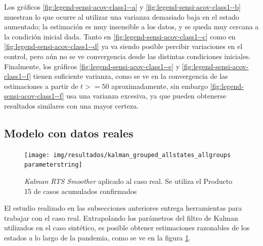 Los gráficos  \ref{fig:legend-sensi-acov-class1--a} y \ref{fig:legend-sensi-acov-class1--b}  muestran lo que ocurre al utilizar una varianza demasiado baja en el estado aumentado; la estimación es muy insensible a los datos, y se queda muy cercana a la condición inicial dada. Tanto en \ref{fig:legend-sensi-acov-class1--c} como en \ref{fig:legend-sensi-acov-class1--d} ya va siendo posible percibir variaciones en el control, pero aún no se ve convergencia desde las distintas condiciones iniciales. Finalmente, los gráficos  \ref{fig:legend-sensi-acov-class1--e} y \ref{fig:legend-sensi-acov-class1--f} tienen suficiente varianza, como se ve en la convergencia de las estimaciones a partir de \(t >=50\) aproximadamente, sin embargo \ref{fig:legend-sensi-acov-class1--f} usa una varianza excesiva, ya que pueden obtenerse resultados similares con una mayor certeza.




\subsection{Modelo con datos reales}\label{subsec:datosreales}

\begin{figure}[H]
\centering
\texttt{[image: img/resultados/kalman\_grouped\_allstates\_allgroups\\parameterstring]}
\caption[\textit{Kalman RTS Smoother} aplicado al caso real ]{\textit{Kalman RTS Smoother} aplicado al caso real. Se utiliza el Producto 15 de casos acumulados confirmados}
\label{all-nohigh}
\end{figure}

El estudio realizado en las subsecciones anteriores entrega herramientas para trabajar con el caso real. Extrapolando los parámetros del filtro de Kalman utilizados en el caso sintético, es posible obtener estimaciones razonables de los estados a lo largo de la pandemia, como se ve en la figura \ref{all-nohigh}.

